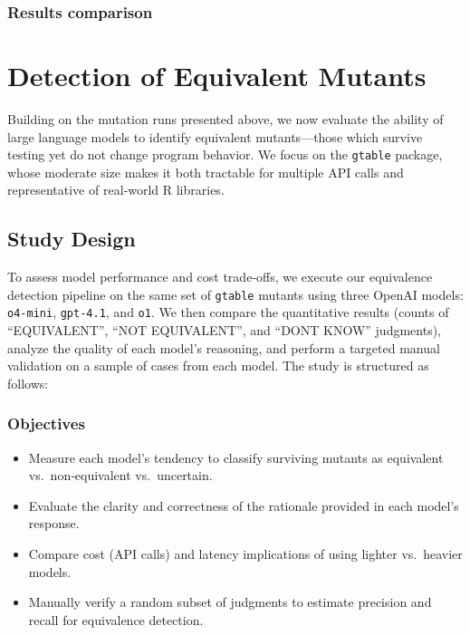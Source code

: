  
\subsubsection{Results comparison}


\section{Detection of Equivalent Mutants}

Building on the mutation runs presented above, we now evaluate the ability of large language models to identify equivalent mutants—those which survive testing yet do not change program behavior.  We focus on the \texttt{gtable} package, whose moderate size makes it both tractable for multiple API calls and representative of real‐world R libraries.

\subsection{Study Design}

To assess model performance and cost trade‐offs, we execute our equivalence detection pipeline on the same set of \texttt{gtable} mutants using three OpenAI models: \texttt{o4-mini}, \texttt{gpt-4.1}, and \texttt{o1}.  We then compare the quantitative results (counts of “EQUIVALENT”, “NOT EQUIVALENT”, and “DONT KNOW” judgments), analyze the quality of each model’s reasoning, and perform a targeted manual validation on a sample of cases from each model.  The study is structured as follows:

\subsubsection{Objectives}
\begin{itemize}
  \item Measure each model’s tendency to classify surviving mutants as equivalent vs.\ non‐equivalent vs.\ uncertain.
  \item Evaluate the clarity and correctness of the rationale provided in each model’s response.
  \item Compare cost (API calls) and latency implications of using lighter vs.\ heavier models.
  \item Manually verify a random subset of judgments to estimate precision and recall for equivalence detection.
\end{itemize}

